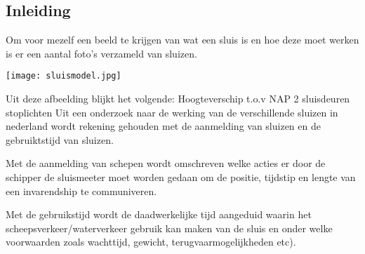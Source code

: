 \subsection{Inleiding}
Om voor mezelf een beeld te krijgen van wat een sluis is en hoe deze moet werken is er een aantal foto's verzameld van sluizen.	

\texttt{[image: sluismodel.jpg]}


Uit deze afbeelding blijkt het volgende:
Hoogteverschip t.o.v NAP
2 sluisdeuren
stoplichten
Uit een onderzoek naar de werking van de verschillende sluizen in nederland wordt rekening gehouden met de aanmelding van sluizen en de gebruiktstijd van sluizen.

Met de aanmelding van schepen wordt omschreven welke acties er door de schipper de sluismeeter moet worden gedaan om de positie, tijdstip en lengte van een invarendship te communiveren.

Met de gebruikstijd wordt  de daadwerkelijke tijd aangeduid waarin het scheepsverkeer/waterverkeer gebruik kan maken van de sluis en onder welke voorwaarden zoals wachttijd, gewicht, terugvaarmogelijkheden etc).

